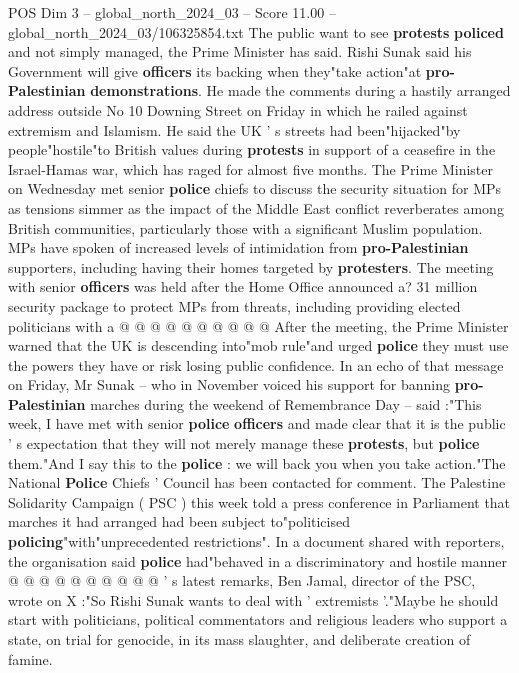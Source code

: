 \begin{textsample}{POS Dim 3 – global\_north\_2024\_03 – Score 11.00 – global\_north\_2024\_03/106325854.txt}  \label{ex:f3_pos_273}
The public want to see \textbf{protests} \textbf{policed} and not simply managed, the Prime Minister has said.
Rishi Sunak said his Government will give \textbf{officers} its backing when they"take action"at \textbf{pro-Palestinian} \textbf{demonstrations}.
He made the comments during a hastily arranged address outside No 10 Downing Street on Friday in which he railed against extremism and Islamism.
He said the UK ' s streets had been"hijacked"by people"hostile"to British values during \textbf{protests} in support of a ceasefire in the Israel-Hamas war, which has raged for almost five months.
The Prime Minister on Wednesday met senior \textbf{police} chiefs to discuss the security situation for MPs as tensions simmer as the impact of the Middle East conflict reverberates among British communities, particularly those with a significant Muslim population.
MPs have spoken of increased levels of intimidation from \textbf{pro-Palestinian} supporters, including having their homes targeted by \textbf{protesters}.
The meeting with senior \textbf{officers} was held after the Home Office announced a? 31 million security package to protect MPs from threats, including providing elected politicians with a @ @ @ @ @ @ @ @ @ @ After the meeting, the Prime Minister warned that the UK is descending into"mob rule"and urged \textbf{police} they must use the powers they have or risk losing public confidence.
In an echo of that message on Friday, Mr Sunak -- who in November voiced his support for banning \textbf{pro-Palestinian} marches during the weekend of Remembrance Day -- said :"This week, I have met with senior \textbf{police} \textbf{officers} and made clear that it is the public ' s expectation that they will not merely manage these \textbf{protests}, but \textbf{police} them."And I say this to the \textbf{police} : we will back you when you take action."The National \textbf{Police} Chiefs ' Council has been contacted for comment.
The Palestine Solidarity Campaign ( PSC ) this week told a press conference in Parliament that marches it had arranged had been subject to"politicised \textbf{policing}"with"unprecedented restrictions".
In a document shared with reporters, the organisation said \textbf{police} had"behaved in a discriminatory and hostile manner @ @ @ @ @ @ @ @ @ @ ' s latest remarks, Ben Jamal, director of the PSC, wrote on X :"So Rishi Sunak wants to deal with ' extremists '."Maybe he should start with politicians, political commentators and religious leaders who support a state, on trial for genocide, in its mass slaughter, and deliberate creation of famine.

\end{textsample}
